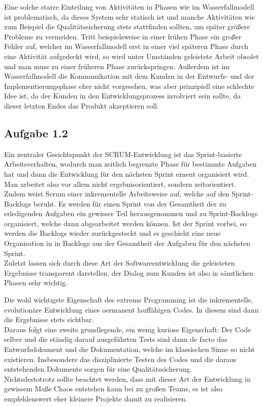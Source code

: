 \documentclass[a4paper,graphics,11pt]{article}
\newcommand\aufgabe[1]{\subsection*{Aufgabe #1}}
\begin{document}
Eine solche starre Einteilung von Aktivitäten in Phasen wie im Wasserfallmodell ist problematisch, da dieses System sehr statisch ist und manche Aktivitäten wie 
zum Beispiel die Qualitätssicherung stets stattfinden sollten, um später größere Probleme zu vermeiden. Tritt beispielsweise in einer frühen Phase ein großer Fehler auf,
welcher im Wasserfallmodell erst in einer viel späteren Phase durch eine Aktivität aufgedeckt wird, so wird unter Umständen geleistete Arbeit obsolet und man muss
zu einer früheren Phase zurückspringen.
Außerdem ist im Wasserfallmodell die Kommunikation mit dem Kunden in der Entwurfs- und der Implementierungsphase eher nicht vorgesehen, was aber prinzipiell
eine schlechte Idee ist, da der Kunden in den Entwicklungsprozess involviert sein sollte, da dieser letzten Endes das Produkt akzeptieren soll.

\aufgabe{1.2}

Ein zentraler Gesichtspunkt der SCRUM-Entwicklung ist das Sprint-basierte Arbeitsverhalten, wodurch man zeitlich begrenzte Phase für bestimmte Aufgaben hat und 
dann die Entwicklung für den nächsten Sprint erneut organisiert wird. Man arbeitet also vor allem nicht ergebnisorientiert, sondern zeitorientiert. \\
Zudem weist Scrum einer inkrementelle Arbeitsweise auf, welche auf den Sprint-Backlogs beruht. Es werden für einen Sprint von der Gesamtheit der zu erledigenden
Aufgaben ein gewisser Teil herausgenommen und zu Sprint-Backlogs organisiert, welche dann abgearbeitet werden können. Ist der Sprint vorbei, so werden die
Backlogs wieder zurückgesteckt und es geschieht eine neue Organisation in in Backlogs aus der Gesamtheit der Aufgaben für den nächsten Sprint. \\
Zuletzt lassen sich durch diese Art der Softwareentwicklung die geleisteten Ergebnisse transparent darstellen, der Dialog zum Kunden ist also in sämtlichen
Phasen sehr wichtig. \par
Die wohl wichtigste Eigenschaft des extreme Programming ist die inkrementelle, evolutionäre Entwicklung eines oermanent lauffähigen Codes. In diesem sind dann
die Ergebnisse stets sichtbar. \\
Daraus folgt eine zweite grundlegende, ein wenig kuriose Eigenschaft: Der Code selber und die ständig darauf ausgeführten Tests sind dann de facto das Entwurfsdokument
und die Dokumentation, welche im klassischen Sinne so nicht existieren. Insbesondere das disziplinierte Testen des Codes und die daraus entstehenden Dokumente sorgen
für eine Qualitätssicherung. \\
Nichtsdestotrotz sollte beachtet werden, dass mit dieser Art der Entwicklung in gewissem Maße Chaos entstehen kann bei zu großen Teams, es ist also empfehlenswert
eher kleinere Projekte damit zu realisieren.
\end{document}
